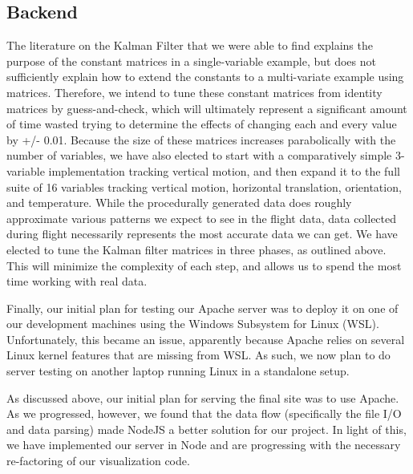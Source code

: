 \documentclass[journal,10pt,onecolumn,compsoc]{IEEEtran}
\begin{document}
	\subsection{Backend}
		The literature on the Kalman Filter that we were able to find explains the purpose of the constant matrices in a single-variable example, but does not sufficiently explain how to extend the constants to a multi-variate example using matrices.
		Therefore, we intend to tune these constant matrices from identity matrices by guess-and-check, which will ultimately represent a significant amount of time wasted trying to determine the effects of changing each and every value by +/- 0.01.
		Because the size of these matrices increases parabolically with the number of variables, we have also elected to start with a comparatively simple 3-variable implementation tracking vertical motion, and then expand it to the full suite of 16 variables tracking vertical motion, horizontal translation, orientation, and temperature.
		While the procedurally generated data does roughly approximate various patterns we expect to see in the flight data, data collected during flight necessarily represents the most accurate data we can get.
		We have elected to tune the Kalman filter matrices in three phases, as outlined above.
		This will minimize the complexity of each step, and allows us to spend the most time working with real data.
		
		Finally, our initial plan for testing our Apache server	was to deploy it on one of our development machines using the Windows Subsystem for Linux (WSL).
		Unfortunately, this became an issue, apparently because Apache relies on several Linux kernel features that are missing from WSL.
		As such, we now plan to do server testing on another laptop running Linux in a standalone setup.
	
		As discussed above, our initial plan for serving the final site was to use Apache.
    As we progressed, however, we found that the data flow (specifically the file I/O and data parsing) made NodeJS a better solution for our project.
    In light of this, we have implemented our server in Node and are progressing with the necessary re-factoring of our visualization code.
	
\end{document}
